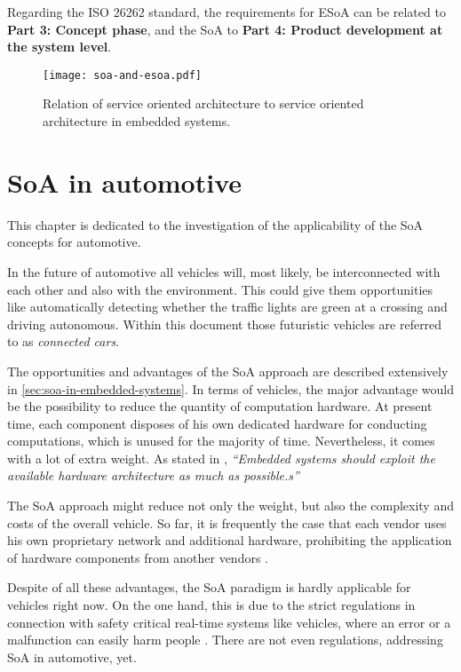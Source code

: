 Regarding the ISO 26262 standard, the requirements for ESoA can be related to \textbf{Part 3: Concept phase}, and the SoA to \textbf{Part 4: Product development at the system level}.


\begin{figure}[!htbp]
\centering
\texttt{[image: soa-and-esoa.pdf]}
\caption{Relation of service oriented architecture to service oriented architecture in embedded systems.}
\label{fig:soa-and-esoa}
\end{figure}







\section{SoA in automotive}
\label{sec:soa-in-automotive}

This chapter is dedicated to the investigation of the applicability of the SoA concepts for automotive.

In the future of automotive all vehicles will, most likely, be interconnected with each other and also with the environment. This could give them opportunities like automatically detecting whether the traffic lights are green at a crossing and driving autonomous. Within this document those futuristic vehicles are referred to as \emph{connected cars}.


The opportunities and advantages of the SoA approach are described extensively in \ref{sec:soa-in-embedded-systems}. In terms of vehicles, the major advantage would be the possibility to reduce the quantity of computation hardware. At present time, each component disposes of his own dedicated hardware for conducting computations, which is unused for the majority of time. Nevertheless, it comes with a lot of extra weight. As stated in \cite[p.7]{marwedel}, \emph{``Embedded systems should exploit the available hardware architecture as much as possible.s''}

The SoA approach might reduce not only the weight, but also the complexity and costs of the overall vehicle. So far, it is frequently the case that each vendor uses his own proprietary network and additional hardware, prohibiting the application of hardware components from another vendors \cite{sommer}.

Despite of all these advantages, the SoA paradigm is hardly applicable for vehicles right now. On the one hand, this is due to the strict regulations in connection with safety critical real-time systems like vehicles, where an error or a malfunction can easily harm people \cite{kum}. There are not even regulations, addressing SoA in automotive, yet.

